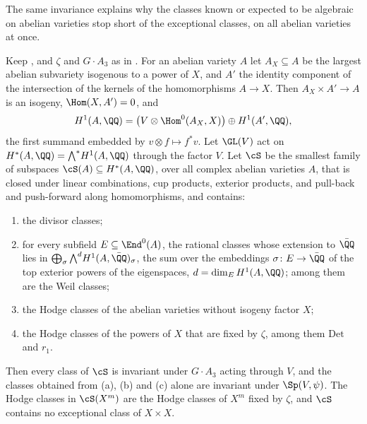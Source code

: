 The same invariance explains why the classes known or expected to be
algebraic on abelian varieties stop short of the exceptional classes, on all
abelian varieties at once.

\begin{proposition}\label{prop:mumfordformal}
Keep , and $\zeta$ and $G\cdot A_{3}$ as in
. For an abelian variety $A$ let $A_{X}\subseteq A$
be the largest abelian subvariety isogenous to a power of $X$, and $A'$ the
identity component of the intersection of the kernels of the homomorphisms
$A\to X$. Then $A_{X}\times A'\to A$ is an isogeny, $\Hom(X,A')=0$, and
\[
  H^{1}(A,\QQ)=\bigl(V\otimes\Hom^{0}(A_{X},X)\bigr)\oplus H^{1}(A',\QQ),
\]
the first summand embedded by $v\otimes f\mapsto f^{*}v$. Let $\GL(V)$ act on
$H^{*}(A,\QQ)={\textstyle\bigwedge^{*}}H^{1}(A,\QQ)$ through the factor $V$. Let $\cS$
be the smallest family of subspaces $\cS(A)\subseteq H^{*}(A,\QQ)$, over all
complex abelian varieties $A$, that is closed under linear combinations, cup
products, exterior products, and pull-back and push-forward along
homomorphisms, and contains:
\begin{enumerate}[label=\textup{(\alph*)},leftmargin=2.6em,itemsep=1pt]
\item the divisor classes;
\item for every subfield $E\subseteq\End^{0}(A)$, the rational classes whose
  extension to $\bar{\QQ}$ lies in $\bigoplus_{\sigma}{\textstyle\bigwedge^{d}}
  H^{1}(A,\bar{\QQ})_{\sigma}$, the sum over the embeddings
  $\sigma\colon E\to\bar{\QQ}$ of the top exterior powers of the eigenspaces,
  $d=\dim_{E}H^{1}(A,\QQ)$; among them are the Weil classes;
\item the Hodge classes of the abelian varieties without isogeny factor $X$;
\item the Hodge classes of the powers of $X$ that are fixed by $\zeta$, among
  them $\mathrm{Det}$ and $r_{1}$.
\end{enumerate}
Then every class of $\cS$ is invariant under $G\cdot A_{3}$ acting through
$V$, and the classes obtained from \textup{(a)}, \textup{(b)} and
\textup{(c)} alone are invariant under $\Sp(V,\psi)$. The Hodge classes in
$\cS(X^{m})$ are the Hodge classes of $X^{m}$ fixed by $\zeta$, and $\cS$
contains no exceptional class of $X\times X$.
\end{proposition}

